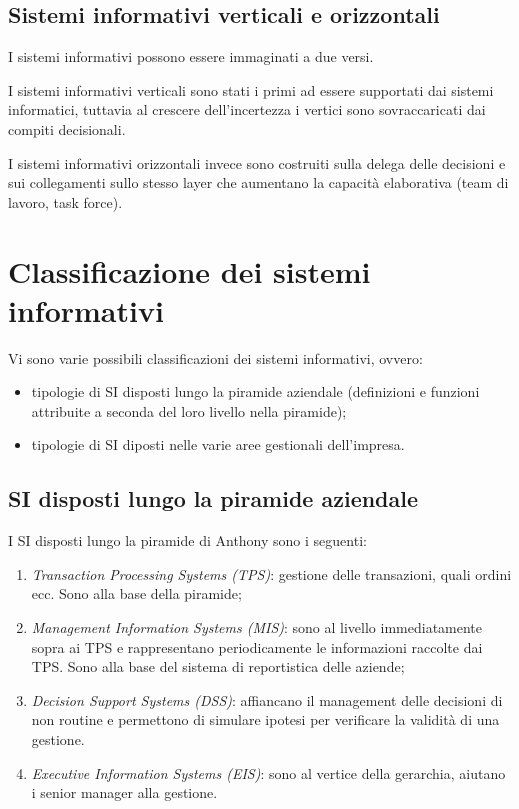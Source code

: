 \documentclass[a4paper, 11pt]{article}
\begin{document}
	\subsection{Sistemi informativi verticali e orizzontali}
	I sistemi informativi possono essere immaginati a due versi. 
	
	I sistemi informativi verticali sono stati i primi ad essere supportati dai sistemi informatici, tuttavia al crescere dell'incertezza i vertici sono sovraccaricati dai compiti decisionali. 
	
	I sistemi informativi orizzontali invece sono costruiti sulla delega delle decisioni e sui collegamenti sullo stesso layer che aumentano la capacità elaborativa (team di lavoro, task force).
	
	\section{Classificazione dei sistemi informativi}
	Vi sono varie possibili classificazioni dei sistemi informativi, ovvero: \begin{itemize}
		\item tipologie di SI disposti lungo la piramide aziendale (definizioni e funzioni attribuite a seconda del loro livello nella piramide);
		\item tipologie di SI diposti nelle varie aree gestionali dell'impresa.
	\end{itemize}

	\subsection{SI disposti lungo la piramide aziendale}
	I SI disposti lungo la piramide di Anthony sono i seguenti:
	\begin{enumerate}
		\item \textit{Transaction Processing Systems (TPS)}: gestione delle transazioni, quali ordini ecc. Sono alla base della piramide;
		
		\item \textit{Management Information Systems (MIS)}: sono al livello immediatamente sopra ai TPS e rappresentano periodicamente le informazioni raccolte dai TPS. Sono alla base del sistema di reportistica delle aziende;
		
		\item \textit{Decision Support Systems (DSS)}: affiancano il management delle decisioni di non routine e permettono di simulare ipotesi per verificare la validità di una gestione.
		
		\item \textit{Executive Information Systems (EIS)}: sono al vertice della gerarchia, aiutano i senior manager alla gestione.
	\end{enumerate}
	
\end{document}
